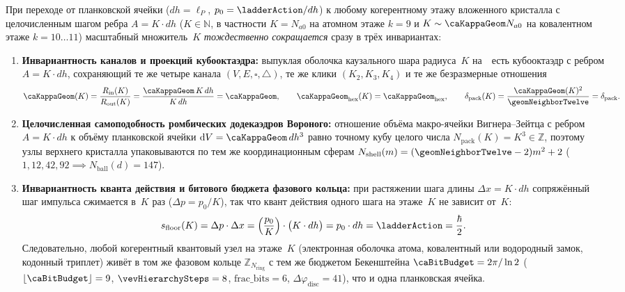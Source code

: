 \begin{theorem}
\label{thm:chem-scale-cancellation}
При переходе от планковской ячейки ($dh=\ell_P$, $p_0=\ladderAction/dh$) к любому когерентному этажу вложенного кристалла
с целочисленным шагом ребра $A = K\cdot dh$ ($K\in\mathbb{N}$, в частности $K = N_{a0}$ на атомном этаже $k=9$ и $K\sim\caKappaGeom N_{a0}$ на ковалентном этаже $k=10\ldots 11$) масштабный множитель~$K$ \emph{тождественно сокращается} сразу в трёх инвариантах:
\begin{enumerate}[noitemsep]
\item \textbf{Инвариантность каналов и проекций кубооктаэдра:}
  выпуклая оболочка каузального шара радиуса~$K$ на~\latGCKshort\ есть кубооктаэдр с ребром $A=K\cdot dh$, сохраняющий те же четыре канала $(V,E,\square,\triangle)$, те же клики $(K_2,K_3,K_4)$ и те же безразмерные отношения
  \[
    \caKappaGeom(K) = \frac{R_{\mathrm{in}}(K)}{R_{\mathrm{out}}(K)} = \frac{\caKappaGeom\,K\,dh}{K\,dh} = \caKappaGeom,\qquad
    \caKappaGeom_{\mathrm{hex}}(K) = \caKappaGeom_{\mathrm{hex}},\qquad
    \delta_{\mathrm{pack}}(K) = \frac{\caKappaGeom(K)^2}{\geomNeighborTwelve} = \delta_{\mathrm{pack}}.
  \]
\item \textbf{Целочисленная самоподобность ромбических додекаэдров Вороного:}
  отношение объёма макро-ячейки Вигнера--Зейтца с ребром $A=K\cdot dh$ к объёму планковской ячейки $\mathrm{d}V=\caKappaGeom\,dh^3$ равно точному кубу целого числа $N_{\mathrm{pack}}(K)=K^3\in\mathbb{Z}$, поэтому узлы верхнего кристалла упаковываются по тем же координационным сферам $N_{\mathrm{shell}}(m)=(\geomNeighborTwelve-2)m^2+2$ ($1,12,42,92 \implies N_{\mathrm{ball}}(d)=147$).
\item \textbf{Инвариантность кванта действия и битового бюджета фазового кольца:}
  при растяжении шага длины $\Delta x = K\cdot dh$ сопряжённый шаг импульса сжимается в~$K$ раз ($\Delta p = p_0/K$), так что квант действия одного шага на этаже~$K$ не зависит от~$K$:
  \[
    s_{\mathrm{floor}}(K) = \Delta p \cdot \Delta x = \left(\frac{p_0}{K}\right)\cdot\bigl(K\cdot dh\bigr) = p_0\cdot dh = \ladderAction = \frac{\hbar}{2}.
  \]
  Следовательно, любой когерентный квантовый узел на этаже~$K$ (электронная оболочка атома, ковалентный или водородный замок, кодонный триплет) живёт в том же фазовом кольце $\mathbb{Z}_{N_{\mathrm{ring}}}$ с тем же бюджетом Бекенштейна $\caBitBudget=2\pi/\ln 2$ ($\lfloor\caBitBudget\rfloor=9$, $\vevHierarchySteps=8$, $\mathrm{frac\_bits}=6$, $\Delta\varphi_{\mathrm{disc}}=41$), что и одна планковская ячейка.
\end{enumerate}
\end{theorem}

